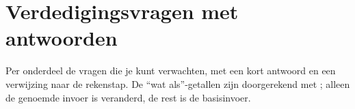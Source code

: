 \chapter{Verdedigingsvragen met antwoorden}
\label{b:vragen}
Per onderdeel de vragen die je kunt verwachten, met een kort antwoord en een verwijzing naar de rekenstap. De ``wat
als''-getallen zijn doorgerekend met ; alleen de genoemde invoer is veranderd, de rest is de basisinvoer.
\newcommand{\V}[2]{\item \textbf{#1}\par\nopagebreak #2}

